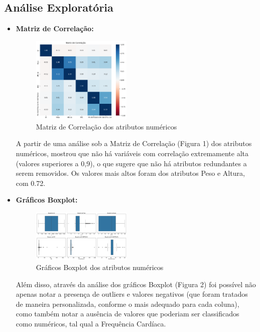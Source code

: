 \documentclass[conference]{IEEEtran}
\begin{document}
\subsection{Análise Exploratória}
\begin{itemize}
    \item \textbf{Matriz de Correlação:} \\
    \begin{figure}[ht]
        \centering
        \includegraphics[width=0.45\textwidth]{matriz_correlacao.png}
        \caption{Matriz de Correlação dos atributos numéricos}
        \label{fig:learning_curve}
    \end{figure}
    
    A partir de uma análise sob a Matriz de Correlação (Figura 1) dos atributos numéricos, mostrou  que não há variáveis com correlação extremamente alta (valores superiores a 0,9), o que sugere que não há atributos redundantes a serem removidos. Os valores mais altos foram dos atributos Peso e Altura, com 0.72. \\
 
    \item \textbf{Gráficos Boxplot:} \\
    \begin{figure}[ht]
        \centering
        \includegraphics[width=0.45\textwidth]{boxplots.png}
        \caption{Gráficos Boxplot dos atributos numéricos}
        \label{fig:boxplots}
    \end{figure}
    
    Além disso, através da análise dos gráficos Boxplot (Figura 2) foi possível não apenas notar a presença de outliers e valores negativos (que foram tratados de maneira personalizada, conforme o mais adequado para cada coluna), como também notar a ausência de valores que poderiam ser classificados como numéricos, tal qual a Frequência Cardíaca.\\
    

\end{itemize}
\end{document}
